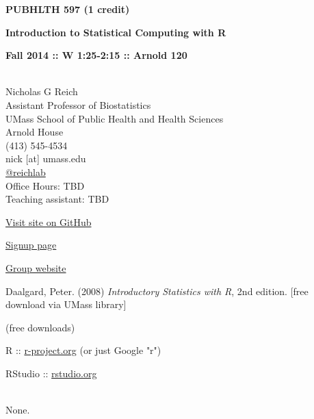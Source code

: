 \documentclass[10pt]{article}
\begin{document}
\centerline{\bf \large 
PUBHLTH 597 (1 credit)} 
\centerline{\bf \large Introduction to Statistical Computing with R}
\centerline{\bf Fall 2014 :: W 1:25-2:15  :: Arnold 120 }

\vspace{.25in}
\\
\noindent Nicholas G Reich \\
\noindent Assistant Professor of Biostatistics \\
\noindent UMass School of Public Health and Health Sciences \\
 Arnold House \\
\noindent (413) 545-4534 \\
\noindent nick [at] umass.edu \\
\noindent \href{https://twitter.com/reichlab}{@reichlab}\\


\noindent Office Hours: TBD \\
\noindent Teaching assistant: TBD 




\bigskip
{}


\href{https://github.com/nickreich/statComp2014}{Visit site on GitHub}


\href{http://piazza.com/umass/fall2014/pubhlth597}{Signup page}

\href{http://piazza.com/umass/fall2014/pubhlth597/home}{Group website}



Daalgard, Peter. (2008) {\em Introductory Statistics with R}, 2nd edition. [free download via UMass library]  



 (free downloads)

R :: \href{http://www.r-project.org}{r-project.org} (or just Google "r")

RStudio :: \href{http://www.rstudio.org}{rstudio.org}


\bigskip
{}\\
None.
\end{document}

